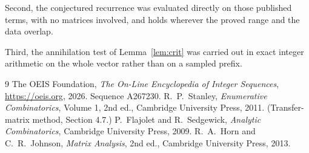 \documentclass[11pt,a4paper]{article}
\theoremstyle{plain}
\theoremstyle{definition}
\begin{document}
Second, the conjectured recurrence was evaluated directly on those published terms, with no
matrices involved, and holds wherever the proved range and the data overlap.

Third, the annihilation test of Lemma~\ref{lem:crit} was carried out in exact integer
arithmetic on the whole vector rather than on a sampled prefix.

\begin{thebibliography}{9}
 The OEIS Foundation, \emph{The On-Line Encyclopedia of Integer
Sequences}, \url{https://oeis.org}, 2026. Sequence A267230.
 R.~P.~Stanley, \emph{Enumerative Combinatorics}, Volume 1, 2nd ed.,
Cambridge University Press, 2011. (Transfer-matrix method, Section 4.7.)
 P.~Flajolet and R.~Sedgewick, \emph{Analytic Combinatorics}, Cambridge
University Press, 2009.
 R.~A.~Horn and C.~R.~Johnson, \emph{Matrix Analysis}, 2nd ed., Cambridge
University Press, 2013.
\end{thebibliography}
\end{document}
